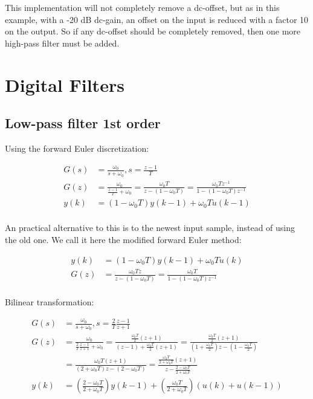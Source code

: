 \documentclass[]{book}
\begin{document}
This implementation will not completely remove a dc-offset, but as in this example, with a -20 dB dc-gain, an offset on the input is reduced with a factor 10 on the output. So if any dc-offset should be completely removed, then one more high-pass filter must be added.

\hypertarget{digital-filters}{%
\section{Digital Filters}\label{digital-filters}}

\hypertarget{low-pass-filter-1st-order-1}{%
\subsection{Low-pass filter 1st order}\label{low-pass-filter-1st-order-1}}

Using the forward Euler discretization:

\[
\begin{aligned}
G(s) &=  \frac{\omega_0}{s + \omega_0}, s=\frac{z-1}{T} \\
G(z) &=  \frac{\omega_0}{\frac{z-1}{T} + \omega_0} = \frac{\omega_0 T}{z- (1 - \omega_0 T)} 
= \frac{\omega_0 T z^{-1}}{1- (1 - \omega_0 T)z^{-1}} \\
y(k) &=   (1 - \omega_0 T)y(k-1)   + \omega_0 T u(k-1) \\
\end{aligned}
\label{eq:dlpf1}
\]

An practical alternative to this is to the newest input sample, instead of using the old one. We call it here the modified forward Euler method:

\[
\begin{aligned}
y(k) &= (1 - \omega_0 T)y(k-1)   + \omega_0 T u(k) \\
G(z) &=  \frac{\omega_0 T z}{z- (1 - \omega_0 T)} = \frac{\omega_0 T }{1- (1 - \omega_0 T)z^{-1}} \\
\end{aligned}
\label{eq:dlpf2}
\]

Bilinear transformation:

\[
\begin{aligned}
G(s) &=  \frac{\omega_0}{s + \omega_0}, s=\frac{2}{T} \frac{z-1}{z+1} \\
G(z) &=  \frac{\omega_0}{\frac{2}{T} \frac{z-1}{z+1} + \omega_0}
= \frac{ \frac{\omega_0T}{2}(z+1)}{ (z-1)+ \frac{\omega_0T}{2} (z+1)} 
= \frac{ \frac{\omega_0T}{2}(z+1)}{  (1+\frac{\omega_0T}{2}) z - (1-\frac{\omega_0T}{2})}  \\
 &=   \frac{ \omega_0T(z+1)}{  (2+\omega_0T) z - (2-\omega_0T)} 
 =  \frac{ \frac{\omega_0T}{2+\omega_0T}(z+1)}{   z - \frac{2-\omega_0T}{2+\omega_0T}}  \\
y(k) &=   \left( \frac{2-\omega_0T}{2+\omega_0T} \right) y(k-1)   + \left( \frac{\omega_0T}{2+\omega_0T} \right)  (u(k)+u(k-1)) \\
\end{aligned}
\label{eq:dlpf3}
\]
\end{document}
